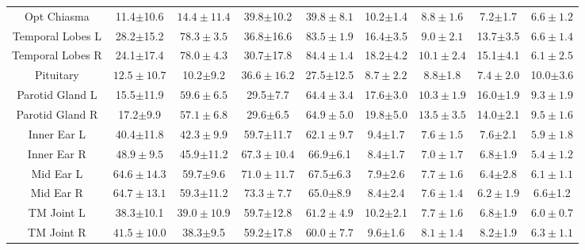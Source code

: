 \begin{table}[t!]
{\begin{subtable}{1\textwidth}
{\begin{tabular}{ccccccccc}
    Opt Chiasma      & 11.4$\pm$10.6      & $\bm{14.4\pm11.4}$ & 39.8$\pm$10.2      & $\bm{39.8\pm8.1}$ & 10.2$\pm$1.4      & $\bm{8.8\pm1.6}$  & 7.2$\pm$1.7      & $\bm{6.6\pm1.2}$ \\
    Temporal Lobes L & 28.2$\pm$15.2      & $\bm{78.3\pm3.5}$  & 36.8$\pm$16.6      & $\bm{83.5\pm1.9}$ & 16.4$\pm$3.5      & $\bm{9.0\pm2.1}$  & 13.7$\pm$3.5     & $\bm{6.6\pm1.4}$ \\
    Temporal Lobes R & 24.1$\pm$17.4      & $\bm{78.0\pm4.3}$  & 30.7$\pm$17.8      & $\bm{84.4\pm1.4}$ & 18.2$\pm$4.2      & $\bm{10.1\pm2.4}$ & 15.1$\pm$4.1     & $\bm{6.1\pm2.5}$ \\
    Pituitary        & $\bm{12.5\pm10.7}$ & 10.2$\pm$9.2       & $\bm{36.6\pm16.2}$ & 27.5$\pm$12.5     & $\bm{8.7\pm2.2}$  & 8.8$\pm$1.8       & $\bm{7.4\pm2.0}$ & 10.0$\pm$3.6     \\
    Parotid Gland L  & 15.5$\pm$11.9      & $\bm{59.6\pm6.5}$  & 29.5$\pm$7.7       & $\bm{64.4\pm3.4}$ & 17.6$\pm$3.0      & $\bm{10.3\pm1.9}$ & 16.0$\pm$1.9     & $\bm{9.3\pm1.9}$ \\
    Parotid Gland R  & 17.2$\pm$9.9       & $\bm{57.1\pm6.8}$  & 29.6$\pm$6.5       & $\bm{64.9\pm5.0}$ & 19.8$\pm$5.0      & $\bm{13.5\pm3.5}$ & 14.0$\pm$2.1     & $\bm{9.5\pm1.6}$ \\
    Inner Ear L      & 40.4$\pm$11.8      & $\bm{42.3\pm9.9}$  & 59.7$\pm$11.7      & $\bm{62.1\pm9.7}$ & 9.4$\pm$1.7       & $\bm{7.6\pm1.5}$  & 7.6$\pm$2.1      & $\bm{5.9\pm1.8}$ \\
    Inner Ear R      & $\bm{48.9\pm9.5}$  & 45.9$\pm$11.2      & $\bm{67.3\pm10.4}$ & 66.9$\pm$6.1      & 8.4$\pm$1.7       & $\bm{7.0\pm1.7}$  & 6.8$\pm$1.9      & $\bm{5.4\pm1.2}$ \\
    Mid Ear L        & $\bm{64.6\pm14.3}$ & 59.7$\pm$9.6       & $\bm{71.0\pm11.7}$ & 67.5$\pm$6.3      & 7.9$\pm$2.6       & $\bm{7.7\pm1.6}$  & 6.4$\pm$2.8      & $\bm{6.1\pm1.1}$ \\
    Mid Ear R        & $\bm{64.7\pm13.1}$ & 59.3$\pm$11.2      & $\bm{73.3\pm7.7}$  & 65.0$\pm$8.9      & 8.4$\pm$2.4       & $\bm{7.6\pm1.4}$  & $\bm{6.2\pm1.9}$ & 6.6$\pm$1.2      \\
    TM Joint L       & 38.3$\pm$10.1      & $\bm{39.0\pm10.9}$ & 59.7$\pm$12.8      & $\bm{61.2\pm4.9}$ & 10.2$\pm$2.1      & $\bm{7.7\pm1.6}$  & 6.8$\pm$1.9      & $\bm{6.0\pm0.7}$ \\
    TM Joint R       & $\bm{41.5\pm10.0}$ & 38.3$\pm$9.5       & 59.2$\pm$17.8      & $\bm{60.0\pm7.7}$ & 9.6$\pm$1.6       & $\bm{8.1\pm1.4}$  & 8.2$\pm$1.9      & $\bm{6.3\pm1.1}$ \\

\end{tabular}}
\end{subtable}}
\end{table}
